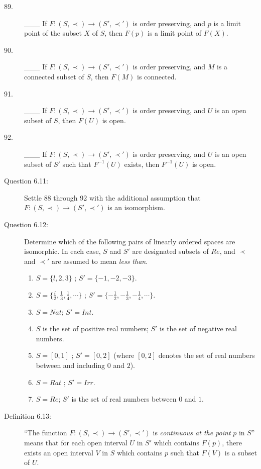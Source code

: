 \documentclass{book}
\begin{document}
\begin{description}
\item[89.] \_\_\_ If $F: (S, \prec) \rightarrow (S', \prec ')$ is order preserving, and $p$ is a limit point of the subset $X$ of $S$, then $F(p)$ is a limit point of $F(X)$.

\item[90.] \_\_\_ If $F: (S, \prec) \rightarrow (S', \prec ')$ is order preserving, and $M$ is a connected subset of $S$, then $F(M)$ is connected.

\item[91.] \_\_\_ If $F: (S, \prec) \rightarrow (S', \prec ')$ is order preserving, and $U$ is an open subset of $S$, then $F(U)$ is open.

\item[92.] \_\_\_ If $F: (S, \prec) \rightarrow (S', \prec ')$ is order preserving, and $U$ is an open subset of $S'$ such that $F^{-1}(U)$ exists, then $F^{-1}(U)$ is open.

\item[Question 6.11:] Settle 88 through 92 with the additional assumption that $\ \ \ \ \ $ $F: (S, \prec) \rightarrow (S', \prec ')$ is an isomorphism.

\item[Question 6.12:] Determine which of the following pairs of linearly ordered spaces are isomorphic. In each case, $S$ and $S'$ are designated subsets of $Re$, and $\prec$ and $\prec '$ are assumed to mean \emph{less than}.
\begin{enumerate}[\hspace{1cm}(a)]
  \item $S = \{ l, 2, 3 \}$ ; $S' = \{ -1, -2, -3 \}$.
  \item $S = \{ \frac{l}{2}, \frac{1}{3}, \frac{1}{4}, \cdots \}$ ; $S' = \{ -\frac{1}{2}, -\frac{1}{3}, -\frac{1}{4}, \cdots \}$.
  \item $S = Nat$; $S' = Int$.
  \item $S$ is the set of positive real numbers; $S'$ is the set of negative real numbers.
  \item $S = [0,1]$ ; $S' = [0,2]$ (where $[0,2]$ denotes the set of real numbers between and including $0$ and $2$).
  \item $S = Rat$ ; $S' = Irr$.
  \item $S = Re$; $S'$ is the set of real numbers between $0$ and $1$.
\end{enumerate}

\item[Definition 6.13:] ``The function $F: (S, \prec) \rightarrow (S', \prec ')$ is \emph{continuous at the point} $p$ in $S$'' means that for each open interval $U$ in $S'$ which contains $F(p)$, there exists an open interval $V$ in $S$ which contains $p$ such that $F(V)$ is a subset of $U$.


\end{description}
\end{document}
